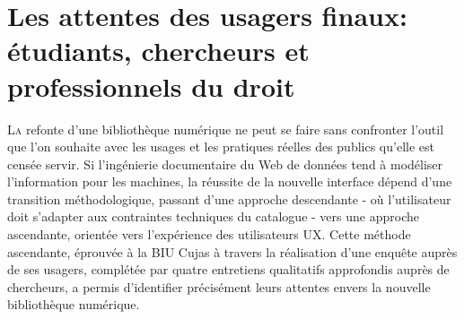 \chapter[Les attentes des usagers]{Les attentes des usagers finaux: étudiants, chercheurs et professionnels du droit}

\lettrine{L}a refonte d'une bibliothèque numérique ne peut se faire sans confronter l'outil que l'on souhaite avec les usages et les pratiques réelles des publics qu'elle est censée servir. Si l'ingénierie documentaire du Web de données tend à modéliser l'information pour les machines, la réussite de la nouvelle interface dépend d'une transition méthodologique, passant d'une approche descendante - où l'utilisateur doit s'adapter aux contraintes techniques du catalogue - vers une approche ascendante, orientée vers l'expérience des utilisateurs \ac{UX}. Cette méthode ascendante, éprouvée à la \ac{BIU Cujas} à travers la réalisation d'une enquête auprès de ses usagers, complétée par quatre entretiens qualitatifs approfondis auprès de chercheurs, a permis d'identifier précisément leurs attentes envers la nouvelle bibliothèque numérique.





